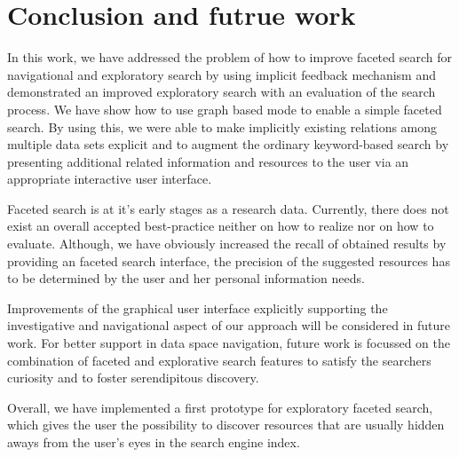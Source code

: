 \chapter{Conclusion and futrue work}
\label{conclusion}

In this work, we have addressed the problem of how to improve faceted search for navigational and exploratory search by using implicit feedback mechanism and demonstrated an improved exploratory search with an evaluation of the search process. We have show how to use graph based mode to enable a simple faceted search. By using this, we were able to make implicitly existing relations among multiple data sets explicit and to augment the ordinary keyword-based search by presenting additional related information and resources to the user via an appropriate interactive user interface.

Faceted search is at it's early stages as a research data. Currently, there does not exist an overall accepted best-practice neither on how to realize nor on how to evaluate. Although, we have obviously increased the recall of obtained results by providing an faceted search interface, the precision of the suggested resources has to be determined by the user and her personal information needs.

Improvements of the graphical user interface explicitly supporting the investigative and navigational aspect of our approach will be considered in future work. For better support in data space navigation, future work is focussed on the combination of faceted and explorative search features to satisfy the searchers curiosity and to foster serendipitous discovery.

Overall, we have implemented a first prototype for exploratory faceted search, which gives the user the possibility to discover resources that are usually hidden aways from the user's eyes in the search engine index.